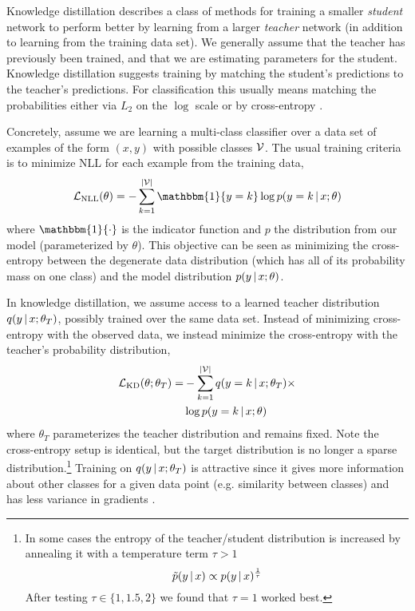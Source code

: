 \documentclass[11pt,letterpaper]{article}
\begin{document}
Knowledge distillation describes a class of methods for training a
smaller \textit{student} network to perform better by learning from a
larger \textit{teacher} network (in addition to learning from the
training data set). We generally assume that the teacher has previously
been trained, and that we are estimating parameters for the student.
Knowledge distillation suggests training by matching the student's
predictions to the teacher's predictions. For classification this
usually means matching the probabilities either via $L_2$ on the
$\log$ scale \cite{Ba2014} or by cross-entropy
\cite{Li2014,Hinton2015}.

Concretely, assume we are learning a multi-class classifier over 
 a data set of examples of the form $(x, y)$ 
with possible classes $\mathcal{V}$. The usual training criteria is to minimize NLL for each example 
from the 
training data,  
\begin{equation*}
\mcL_{\text{NLL}}(\theta) =  -  \sum_{k=1}^{|\mcV|} \mathbbm{1}\{y=k\} \log p(y=k \given x;\theta)
\end{equation*}
where $\mathbbm{1}\{\cdot\}$ is the indicator function and $p$ the
distribution from our model (parameterized by $\theta$). This objective can be seen
as minimizing the cross-entropy between the degenerate data
distribution (which has all of its probability mass on one class) and
the model distribution $p(y \,|\, x;\theta)$.

In knowledge distillation, we assume access to a learned teacher distribution $q(y\,|\, x; \theta_T)$,
possibly trained over the same data set. Instead of minimizing cross-entropy with the 
observed data, we instead minimize the cross-entropy with the teacher's probability distribution,
\begin{align*}
\mathcal{L}_{\text{KD}}(\theta;\theta_T) =& - \sum_{k=1}^{|\mathcal{V}|}  q(y = k \,|\, x;\theta_T) \times \\
& \log p(y = k \,|\, x;\theta)
\end{align*}
where $\theta_T$ parameterizes the teacher distribution and remains fixed.
Note the cross-entropy setup is identical, but the target distribution is no longer a sparse distribution.\footnote{
In some cases the entropy of the teacher/student 
distribution is increased by annealing it with
a temperature term $\tau > 1$
\begin{equation*}
\tilde{p}(y \,|\,  x) \propto p(y \,|\, x)^{\frac{1}{\tau}}
\end{equation*} After testing $\tau \in \{1, 1.5, 2\}$ we
found that  $\tau =1$ worked best.} Training on $q(y \,|\, x;\theta_T)$ is attractive
since it gives more information about other classes for a given data point (e.g.
similarity between classes) and has less variance in gradients \cite{Hinton2015}.
\end{document}
